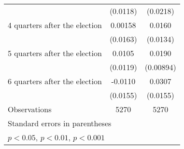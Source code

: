 \begin{table}[htbp]
\begin{tabular}{l*{2}{c}}
                    &    (0.0118)         &    (0.0218)         \\
[1em]
 4 quarters after the election&     0.00158         &      0.0160         \\
                    &    (0.0163)         &    (0.0134)         \\
[1em]
 5 quarters after the election&      0.0105         &      0.0190\sym{*}  \\
                    &    (0.0119)         &   (0.00894)         \\
[1em]
 6 quarters after the election&     -0.0110         &      0.0307\sym{*}  \\
                    &    (0.0155)         &    (0.0155)         \\
\hline
Observations        &        5270         &        5270         \\
\hline\hline
\multicolumn{3}{l}{\footnotesize Standard errors in parentheses}\\
\multicolumn{3}{l}{\footnotesize \sym{*} \(p<0.05\), \sym{**} \(p<0.01\), \sym{***} \(p<0.001\)}\\
\end{tabular}
\end{table}
